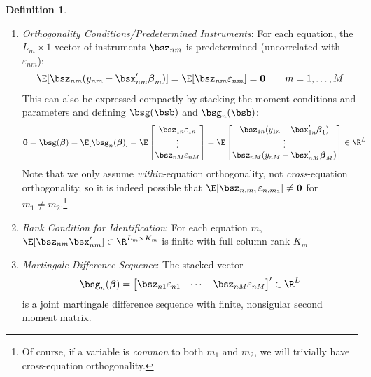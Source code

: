 \documentclass[12pt]{article}
\theoremstyle{plain}
\theoremstyle{definition}
\newtheorem{defn}[thm]{Definition}
\theoremstyle{remark}
\newcommand{\bsbeta}{\boldsymbol{\beta}}
\renewcommand{\bso}{\boldsymbol{0}}
\begin{document}
\begin{defn}
\begin{enumerate}
  \item \emph{Orthogonality Conditions/Predetermined Instruments}:
    For each equation, the $L_m\times 1$ vector of instruments
    $\bsz_{nm}$ is predetermined (uncorrelated with $\varepsilon_{nm}$):
    \begin{align*}
      \E[\bsz_{nm} (y_{nm} - \bsx'_{nm} \bsbeta_m)]
        =\E[\bsz_{nm}\varepsilon_{nm}]= \bso
      \qquad m = 1,\ldots,M
    \end{align*}
    This can also be expressed compactly by stacking the moment
    conditions and parameters and defining $\bsg(\bsb)$ and
    $\bsg_n(\bsb)$:
    \begin{align}
      \bso &=
      \bsg(\bsbeta) =
      \E[\bsg_n(\bsbeta)] =
      \E
      \begin{bmatrix}
        \bsz_{1n}\varepsilon_{1n} \\
        \vdots\\
        \bsz_{nM}\varepsilon_{nM} \\
      \end{bmatrix}
      =
      \E
      \begin{bmatrix}
        \bsz_{1n}(y_{1n}-\bsx_{1n}'\bsbeta_1) \\
        \vdots\\
        \bsz_{nM}(y_{nM}-\bsx_{nM}'\bsbeta_M) \\
      \end{bmatrix}
      \in \R^{L}
      \label{multipleortho}
    \end{align}
    Note that we only assume \emph{within}-equation orthogonality, not
    \emph{cross}-equation orthogonality, so it is indeed possible that
    $\E[\bsz_{n,m_1}\varepsilon_{n,m_2}]\neq\bso$ for
    $m_1\neq m_2$.\footnote{%
      Of course, if a variable is \emph{common} to both $m_1$ and $m_2$,
      we will trivially have cross-equation orthogonality.
    }

  \item \emph{Rank Condition for Identification}:
    For each equation $m$,
    $\E[\bsz_{nm}\bsx_{nm}']\in\R^{L_m \times K_m}$ is finite with full
    column rank $K_m$

  \item \emph{Martingale Difference Sequence}:
    The stacked vector
    \begin{align*}
      \bsg_n(\bsbeta) =
      \begin{bmatrix}
        \bsz_{n1}\varepsilon_{n1} & \cdots &
        \bsz_{nM}\varepsilon_{nM}
      \end{bmatrix}'
        \in \R^L
    \end{align*}
    is a joint martingale difference sequence with finite, nonsigular
    second moment matrix.
\end{enumerate}
\end{defn}
\end{document}
